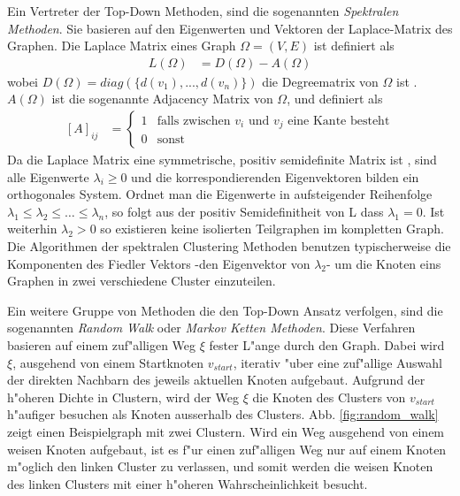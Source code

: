 \documentclass[journal]{vgtc}
\begin{document}
  Ein Vertreter der Top-Down Methoden, sind die sogenannten \emph{Spektralen Methoden}. Sie basieren auf den
  Eigenwerten und Vektoren der Laplace-Matrix des Graphen. Die Laplace Matrix eines Graph
  $\Omega=(V,E)$ ist definiert als
  \begin{align}
    L(\Omega)&=D(\Omega)-A(\Omega)
  \end{align}
  wobei $D(\Omega)=diag(\{d(v_1), ..., d(v_n)\})$ die Degreematrix von $\Omega$ ist \cite{graphcontrol}.
  $A(\Omega)$ ist die sogenannte Adjacency Matrix von $\Omega$, und definiert als
  \begin{align}
   \left[A\right]_{ij}&= \begin{cases}
			    1 & \text{falls zwischen }v_i\text{ und }v_j\text{ eine Kante besteht}\\
			    0 & \text{sonst}
			  \end{cases}
  \end{align}
  Da die Laplace Matrix eine symmetrische, positiv semidefinite Matrix ist \cite{graphcontrol}, sind alle Eigenwerte $\lambda_i \ge 0$
  und die korrespondierenden Eigenvektoren bilden ein orthogonales System. Ordnet man die Eigenwerte in
  aufsteigender Reihenfolge $\lambda_1 \le \lambda_2 \le \dots \le \lambda_n$, so folgt aus der positiv Semidefinitheit
  von L dass $\lambda_1 = 0$. Ist weiterhin $\lambda_2 > 0$ so existieren keine isolierten Teilgraphen im kompletten
  Graph\cite{graphcontrol}. Die Algorithmen der spektralen Clustering Methoden benutzen typischerweise die Komponenten des Fiedler
  Vektors -den Eigenvektor von $\lambda_2$- um die Knoten eins Graphen in zwei verschiedene Cluster einzuteilen\cite{Schaeffer}.

  Ein weitere Gruppe von Methoden die den Top-Down Ansatz verfolgen, sind die sogenannten \emph{Random Walk} oder
  \emph{Markov Ketten Methoden}. Diese Verfahren basieren auf einem zuf"alligen Weg $\xi$ fester L"ange durch den Graph.
  Dabei wird $\xi$, ausgehend von einem Startknoten $v_{start}$, iterativ "uber eine zuf"allige Auswahl
  der direkten Nachbarn des jeweils aktuellen Knoten aufgebaut. Aufgrund der h"oheren Dichte in Clustern, wird der Weg
  $\xi$ die Knoten des Clusters von $v_{start}$ h"aufiger besuchen als Knoten ausserhalb des Clusters.
  Abb. \ref{fig:random_walk} zeigt einen Beispielgraph mit zwei Clustern. Wird ein Weg ausgehend von einem weisen
  Knoten aufgebaut, ist es f"ur einen zuf"alligen Weg nur auf einem Knoten m"oglich den linken Cluster zu verlassen,
  und somit werden die weisen Knoten des linken Clusters mit einer h"oheren Wahrscheinlichkeit besucht. 
\end{document}

